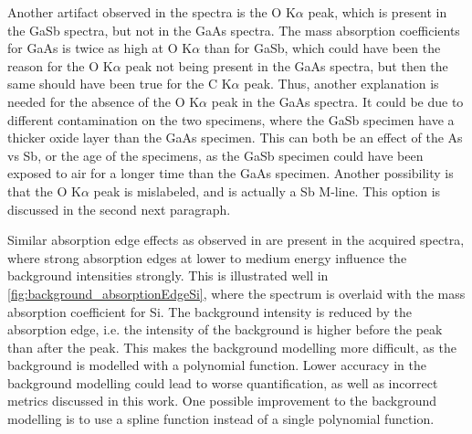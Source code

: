 Another artifact observed in the spectra is the O K$\alpha$ peak, which is present in the GaSb spectra, but not in the GaAs spectra.
The mass absorption coefficients for GaAs is twice as high at O K$\alpha$ than for GaSb, which could have been the reason for the O K$\alpha$ peak not being present in the GaAs spectra, but then the same should have been true for the C K$\alpha$ peak.
Thus, another explanation is needed for the absence of the O K$\alpha$ peak in the GaAs spectra.
It could be due to different contamination on the two specimens, where the GaSb specimen have a thicker oxide layer than the GaAs specimen.
This can both be an effect of the As vs Sb, or the age of the specimens, as the GaSb specimen could have been exposed to air for a longer time than the GaAs specimen.
Another possibility is that the O K$\alpha$ peak is mislabeled, and is actually a Sb M-line.
This option is discussed in the second next paragraph.


Similar absorption edge effects as observed in \cite{project_report} are present in the acquired spectra, where strong absorption edges at lower to medium energy influence the background intensities strongly.
This is illustrated well in \cref{fig:background_absorptionEdgeSi}, where the spectrum is overlaid with the mass absorption coefficient for Si.
The background intensity is reduced by the absorption edge, i.e. the intensity of the background is higher before the peak than after the peak.
This makes the background modelling more difficult, as the background is modelled with a polynomial function.
Lower accuracy in the background modelling could lead to worse quantification, as well as incorrect metrics discussed in this work.
One possible improvement to the background modelling is to use a spline function instead of a single polynomial function.


